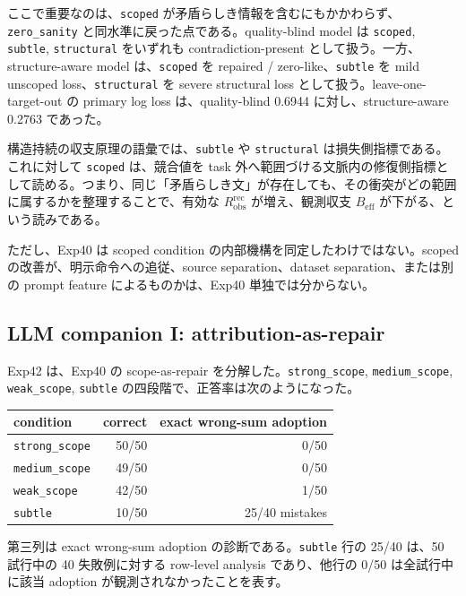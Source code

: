 \documentclass[12pt,a4paper]{article}
\begin{document}
ここで重要なのは、\texttt{scoped} が矛盾らしき情報を含むにもかかわらず、\texttt{zero\_sanity} と同水準に戻った点である。quality-blind model は \texttt{scoped}, \texttt{subtle}, \texttt{structural} をいずれも contradiction-present として扱う。一方、structure-aware model は、\texttt{scoped} を repaired / zero-like、\texttt{subtle} を mild unscoped loss、\texttt{structural} を severe structural loss として扱う。leave-one-target-out の primary log loss は、quality-blind 0.6944 に対し、structure-aware 0.2763 であった。

構造持続の収支原理の語彙では、\texttt{subtle} や \texttt{structural} は損失側指標である。これに対して \texttt{scoped} は、競合値を task 外へ範囲づける文脈内の修復側指標として読める。つまり、同じ「矛盾らしき文」が存在しても、その衝突がどの範囲に属するかを整理することで、有効な \(R_{\mathrm{obs}}^{\mathrm{rec}}\) が増え、観測収支 \(B_{\mathrm{eff}}\) が下がる、という読みである。

ただし、Exp40 は scoped condition の内部機構を同定したわけではない。scoped の改善が、明示命令への追従、source separation、dataset separation、または別の prompt feature によるものかは、Exp40 単独では分からない。

\subsection{LLM companion I: attribution-as-repair}\label{llm-companion-i-attribution-as-repair}

Exp42 は、Exp40 の scope-as-repair を分解した。\texttt{strong\_scope}, \texttt{medium\_scope}, \texttt{weak\_scope}, \texttt{subtle} の四段階で、正答率は次のようになった。

{\def\LTcaptype{table} %
\begin{longtable}[]{@{}lrr@{}}
\toprule\noalign{}
condition & correct & exact wrong-sum adoption \\
\midrule\noalign{}
\endhead
\bottomrule\noalign{}
\endlastfoot
\texttt{strong\_scope} & 50/50 & 0/50 \\
\texttt{medium\_scope} & 49/50 & 0/50 \\
\texttt{weak\_scope} & 42/50 & 1/50 \\
\texttt{subtle} & 10/50 & 25/40 mistakes \\
\end{longtable}
}

第三列は exact wrong-sum adoption の診断である。\texttt{subtle} 行の 25/40 は、50 試行中の 40 失敗例に対する row-level analysis であり、他行の 0/50 は全試行中に該当 adoption が観測されなかったことを表す。
\end{document}
